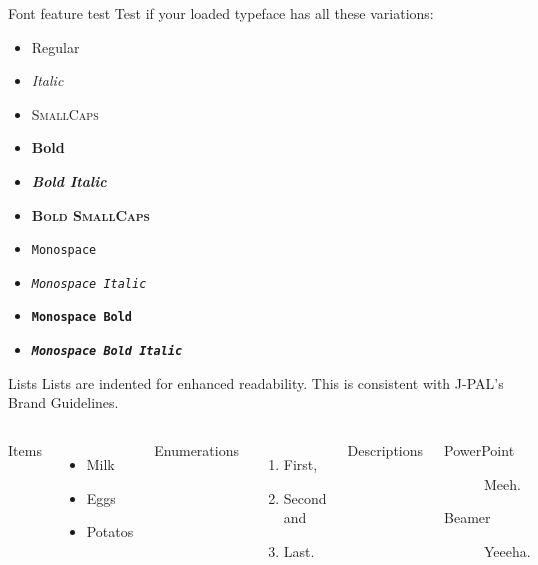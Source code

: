 \documentclass{beamer}
\begin{document}
\begin{frame}{Font feature test}
Test if your loaded typeface has all these variations:
  \begin{itemize}
    \item Regular
    \item \textit{Italic}
    \item \textsc{SmallCaps}
    \item \textbf{Bold}
    \item \textbf{\textit{Bold Italic}}
    \item \textbf{\textsc{Bold SmallCaps}}
    \item \texttt{Monospace}
    \item \texttt{\textit{Monospace Italic}}
    \item \texttt{\textbf{Monospace Bold}}
    \item \texttt{\textbf{\textit{Monospace Bold Italic}}}
  \end{itemize}
\end{frame}

\begin{frame}{Lists}
Lists are indented for enhanced readability. This is consistent with J-PAL's Brand Guidelines.

\vspace{\baselineskip}
  \begin{columns}[T,onlytextwidth]
      Items
      \begin{itemize}
        \item Milk \item Eggs \item Potatos
      \end{itemize}

      Enumerations
      \begin{enumerate}
        \item First, \item Second and \item Last.
      \end{enumerate}

      Descriptions
      \begin{description}
        \item[PowerPoint] Meeh. \item[Beamer] Yeeeha.
      \end{description}
  \end{columns}
\end{frame}
\end{document}
